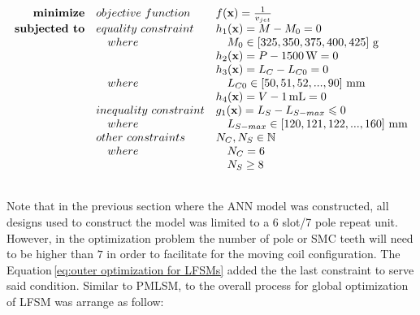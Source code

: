                 \begin{equation}
                    \begin{array}{rll}
                        \textbf{minimize}       & \small{objective\,\,function}     & f(\textbf{x})=\frac{1}{v_{jet}} \\
                        \textbf{subjected to}   & \small{equality\,\,constraint}    & h_1(\textbf{x})=M - M_0= 0\\
                                                &\quad \small{where}                &\quad  M_0\in\left[325,350,375,400,425\right]\,\mathrm{g}\\
                                                &                                   & h_2(\textbf{x})=P - 1500\,\mathrm{W}=0\\
                                                &                                   & h_3(\textbf{x})=L_C - L_{C0} = 0\\
                                                &\quad \small{where}                &\quad  L_{C0}\in\left[50,51,52,...,90\right]\,\mathrm{mm}\\
                                                &                                   & h_4(\textbf{x})=V - 1\,\mathrm{mL} = 0\\
                                                & \small{inequality\,\,constraint}  & g_1(\textbf{x})=L_S-L_{S-max} \leqslant 0\\
                                                &\quad \small{where}                &\quad L_{S-max} \in \left[120,121,122,...,160\right]\,\mathrm{mm} \\
                                                & \small{other\,\,constraints}       & N_C, N_S \in 	\mathbb{N} \\ 
                                                &\quad \small{where}                &\quad N_C = 6\\
                                                &                                   &\quad N_S \geq 8
                                                \\ \\
                    \end{array}
                    \label{eq:outer optimization for LFSMs}
                \end{equation}
                
                
                Note that in the previous section where the \acs{ANN} model was constructed, all designs used to construct the model was limited to a 6 slot/7 pole repeat unit. However, in the optimization problem the number of pole or \acs{SMC} teeth will need to be higher than $7$ in order to facilitate for the moving coil configuration. The Equation\,\ref{eq:outer optimization for LFSMs} added the the last constraint to serve said condition. Similar to \acs{PMLSM}, to the overall process for global optimization of \acs{LFSM} was arrange as follow:
                
